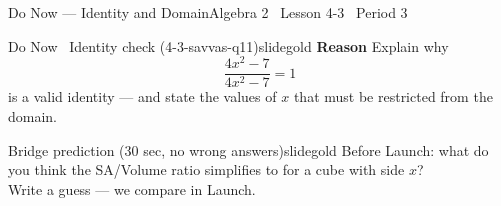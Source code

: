\documentclass[aspectratio=169, 11pt]{beamer}
\begin{document}

\begin{frame}{Do Now --- Identity and Domain}{Algebra 2 \textperiodcentered\ Lesson 4-3 \textperiodcentered\ Period 3}
\vspace{0.2cm}
\begin{projcard}{Do Now \textperiodcentered\ Identity check (4-3-savvas-q11)}{slidegold}
\textbf{Reason} Explain why
\[
\frac{4x^2-7}{4x^2-7}=1
\]
is a valid identity --- and state the values of \(x\) that must be restricted from the domain.
\end{projcard}

\vspace{0.15cm}
\begin{projcard}{Bridge prediction (30 sec, no wrong answers)}{slidegold}
Before Launch: what do you think the SA/Volume ratio simplifies to for a cube with side \(x\)?\\
Write a guess --- we compare in Launch.
\end{projcard}
\end{frame}
\end{document}

